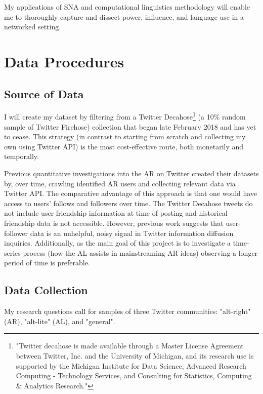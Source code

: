 \documentclass[acmlarge, screen, authorversion]{acmart}
\begin{document}
My applications of SNA and computational linguistics methodology will enable me to thoroughly capture and dissect power, influence, and language use in a networked setting.

\section{Data Procedures}

\subsection{Source of Data}

I will create my dataset by filtering from a Twitter Decahose\footnote{"Twitter
decahose is made available through a Master License Agreement between Twitter,
Inc. and the University of Michigan, and its research use is supported by the
Michigan Institute for Data Science, Advanced Research Computing - Technology
Services, and Consulting for Statistics, Computing \& Analytics Research."} (a
10\% random sample of Twitter Firehose) collection that began late February 2018
and has yet to cease. This strategy (in contrast to starting from scratch and
collecting my own using Twitter API) is the most cost-effective route, both
monetarily and temporally.

Previous quantitative investigations into the AR on Twitter
\cite{bergerAltrightTwitterCensus2018, alizadehPsychologyMoralityPolitical2019} created their datasets by, over
time, crawling identified AR users and collecting relevant data via Twitter API.
The comparative advantage of this approach is that one would have access to
users' follows and followers over time. The Twitter Decahose tweets do not
include user friendship information at time of posting and historical friendship
data is not accessible. However, previous work
\cite{chaMeasuringUserInfluence2010,
versteegInformationtheoreticMeasuresInfluence2013} suggests that user-follower
data is an unhelpful, noisy signal in Twitter information
diffusion inquiries. Additionally, as the main goal of this project is to
investigate a time-series process (how the AL assists in mainstreaming AR ideas)
observing a longer period of time is preferable.

\subsection{Data Collection}

My research questions call for samples of three Twitter communities: "alt-right" (AR), "alt-lite" (AL), and "general".
\end{document}
